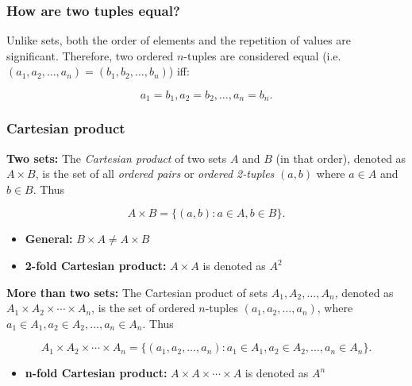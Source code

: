     \subsubsection{How are two tuples equal?}
    \begin{definition}
        Unlike sets, both the order of elements and the repetition of values are significant. Therefore, two ordered \( n \)-tuples are considered equal (i.e. $(a_1, a_2, \dots, a_n) = (b_1, b_2, \dots, b_n)$) iff:

        \[
        a_1 = b_1, a_2 = b_2, \dots, a_n = b_n.
        \]
    \end{definition}

    \subsubsection{Cartesian product}
    \begin{definition}
        \textbf{Two sets:}
        The \textit{Cartesian product} of two sets \( A \) and \( B \) (in that order), denoted as \( A \times B \), is the set of all \textit{ordered pairs} or \textit{ordered 2-tuples} \( (a, b) \) where \( a \in A \) and \( b \in B \). Thus

        \begin{equation}
            A \times B = \{ (a, b) : a \in A, b \in B \}.    
        \end{equation}
        \begin{itemize}
            \item \textbf{General:} $B \times A \neq A \times B$
            \item \textbf{2-fold Cartesian product:} $A \times A$ is denoted as $A^2$
        \end{itemize}
        \vspace{1em}

        \textbf{More than two sets:}
        The Cartesian product of sets \( A_1, A_2, \dots, A_n \), denoted as \( A_1 \times A_2 \times \cdots \times A_n \), is the set of ordered \( n \)-tuples \( (a_1, a_2, \dots, a_n) \), where \( a_1 \in A_1, a_2 \in A_2, \dots, a_n \in A_n \). Thus

        \begin{equation}
            A_1 \times A_2 \times \cdots \times A_n = \{(a_1, a_2, \dots, a_n) : a_1 \in A_1, a_2 \in A_2, \dots, a_n \in A_n\}.
        \end{equation}
        \begin{itemize}
            \item \textbf{n-fold Cartesian product:} $A\times A\times \cdots \times A$ is denoted as $A^n$
        \end{itemize}

    \end{definition}

